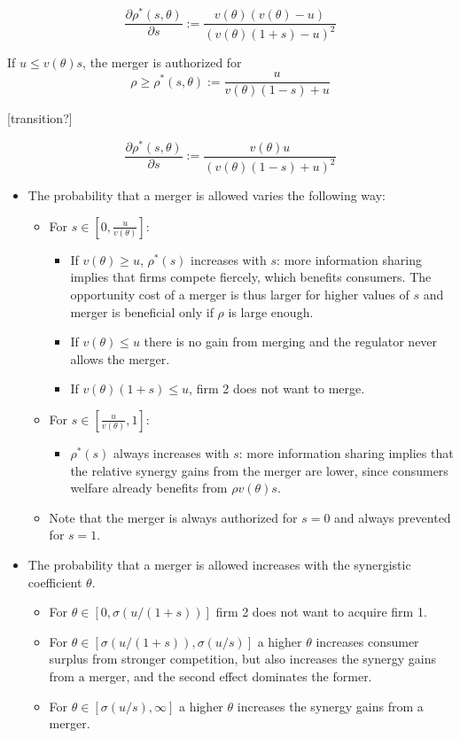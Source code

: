 \documentclass[a4paper,leqno]{article}%
\renewcommand{\t}{\theta}
\newcommand{\s}{\sigma}
\begin{document}
\[
\frac{\partial \rho^{*}(s,\t)}{\partial s}:=\frac{v(\t)(v(\t)-u)}{(v(\t)(1+s)-u)^2}
\]
    
If $u\leq v(\t)s$, the merger is authorized for 
    \begin{equation}
           \rho\geq \rho^*(s,\t):=\frac{u}{v(\t)(1-s)+u}
    \end{equation}

[transition?]

\[
    \frac{\partial \rho^{*}(s,\t)}{\partial s}:=\frac{v(\t)u}{(v(\t)(1-s)+u)^2}
\]


\begin{itemize}
    \item The probability that a merger is allowed varies the following way:
    \begin{itemize}
        \item For $s\in[0,\frac{u}{v(\t)}]$:
        \begin{itemize}
            \item If $v(\t)\geq u$, $\rho^*(s)$ increases with $s$: more information sharing implies that firms compete fiercely, which benefits consumers. The opportunity cost of a merger is thus larger for higher values of $s$ and merger is beneficial only if $\rho$ is large enough.
            \item If $v(\t)\leq u$ there is no gain from merging and the regulator never allows the merger.
            \item If $v(\t)(1+s)\leq u$, firm 2 does not want to merge.
        \end{itemize}
        \item For $s\in[\frac{u}{v(\t)},1]$:
        \begin{itemize}
            \item $\rho^*(s)$ always increases with $s$: more information sharing implies that the relative synergy gains from the merger are lower, since consumers welfare already benefits from $\rho v(\t)s$.
        \end{itemize}
        \item Note that the merger is always authorized for $s=0$ and always prevented for $s=1$.
    \end{itemize} 
    \item The probability that a merger is allowed increases with the synergistic coefficient $\t$. 
    \begin{itemize}
        \item For $\t\in[0,\s(u/(1+s))]$ firm 2 does not want to acquire firm 1.
        \item For $\t\in[\s(u/(1+s)),\s(u/s)]$ a higher $\t$ increases consumer surplus from stronger competition, but also increases the synergy gains from a merger, and the second effect dominates the former.
        \item For $\t\in[\s(u/s),\infty]$ a higher $\t$ increases the synergy gains from a merger.
    \end{itemize} 
\end{itemize}
\end{document}
